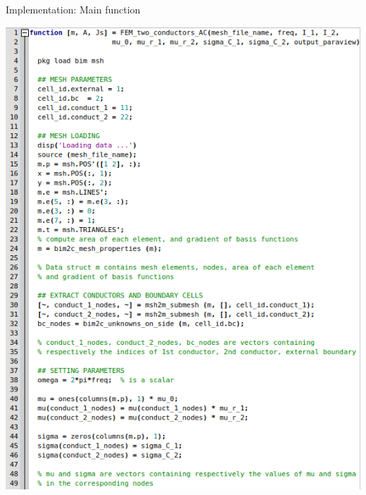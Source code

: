 \documentclass[aspectratio=54,xcolor=dvipsnames]{beamer}
\begin{document}
\begin{frame}{Implementation: Main function}
    \begin{center}
        \begin{minipage}{0.49\textwidth}
            \centering
            \includegraphics[width=\textwidth]{Images/Main_code1.png}
        \end{minipage}\hfill
        \begin{minipage}{0.49\textwidth}
            \centering

\end{minipage}
\end{center}
\end{frame}
\end{document}
